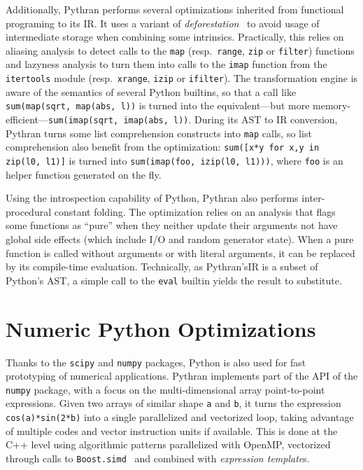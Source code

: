 \documentclass{llncs}
\begin{document}
Additionally, Pythran performs several optimizations inherited from functional
programing to its \ac{IR}. It uses a variant of
\emph{deforestation}~\cite{Wadler1988} to avoid usage of intermediate storage
when combining some intrinsics. Practically, this relies on aliasing analysis
to detect calls to the \texttt{map} (resp.\ \texttt{range}, \texttt{zip} or
\texttt{filter}) functions and lazyness analysis to turn them into calls to the
\texttt{imap} function from the \texttt{itertools} module (resp.\
\texttt{xrange}, \texttt{izip} or \texttt{ifilter}). The transformation engine
is aware of the semantics of several Python builtins, so that a call like
\texttt{sum(map(sqrt, map(abs, l))} is turned into the equivalent---but more
memory-efficient---\texttt{sum(imap(sqrt, imap(abs, l))}. During its \ac{AST}
to \ac{IR} conversion, Pythran turns some list comprehension constructs into
\texttt{map} calls, so list comprehension also benefit from the optimization:
\texttt{sum([x*y for x,y in zip(l0, l1)]} is turned into \texttt{sum(imap(foo,
izip(l0, l1)))}, where \texttt{foo} is an helper function generated on the fly.

Using the introspection capability of Python, Pythran also performs
inter-procedural constant folding. The optimization relies on an analysis that
flags some functions as ``pure'' when they neither update their arguments not
have global side effects (which include I/O and random generator state). When a
pure function is called without arguments or with literal arguments, it can be
replaced by its compile-time evaluation. Technically, as Pythran's\ac{IR} is a
subset of Python's \ac{AST}, a simple call to the \texttt{eval} builtin yields
the result to substitute.

\section{Numeric Python Optimizations}
\label{sec:numeric-optim}

Thanks to the \texttt{scipy} and \texttt{numpy} packages, Python is also used
for fast prototyping of numerical applications. Pythran
implements part of the \acs{API} of the \texttt{numpy} package, with a focus on
the multi-dimensional array point-to-point expressions. Given two arrays of
similar shape \texttt{a} and \texttt{b}, it turns the expression
\texttt{cos(a)*sin(2*b)} into a single parallelized and vectorized loop, taking
advantage of multiple codes and vector instruction units if available. This is
done at the C++ level using algorithmic patterns parallelized with OpenMP,
vectorized through calls to \texttt{Boost.simd}~\cite{boostsimd2012} and
combined with \emph{expression template}s.
\end{document}
